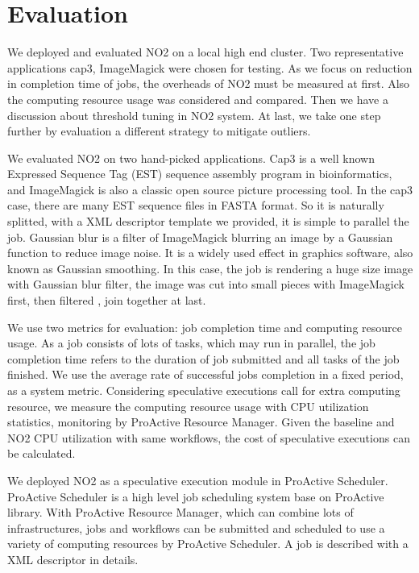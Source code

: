 \section{Evaluation}
We deployed and evaluated NO2 on a local high end cluster. Two representative applications cap3, ImageMagick were chosen for testing. As we focus on reduction in completion time of jobs, the overheads of NO2 must be measured at first. Also the computing resource usage was considered and compared. Then we have a discussion about threshold tuning in NO2 system. At last, we take one step further by evaluation a different strategy to mitigate outliers.

We evaluated NO2 on two hand-picked applications. Cap3 is a well known Expressed Sequence Tag (EST) sequence assembly program in bioinformatics, and ImageMagick is also a classic open source picture processing tool. In the cap3 case, there are many EST sequence files in FASTA format. So it is naturally splitted, with a XML descriptor template we provided, it is simple to parallel the job. Gaussian blur is a filter of ImageMagick blurring an image by a Gaussian function to reduce image noise. It is a widely used effect in graphics software, also known as Gaussian smoothing. In this case, the job is rendering a huge size image with Gaussian blur filter, the image was cut into small pieces with ImageMagick first, then filtered , join together at last. 

We use two metrics for evaluation: job completion time and computing resource usage. As a job consists of lots of tasks, which may run in parallel, the job completion time refers to the duration of job submitted and all tasks of the job finished. We use the average rate of successful jobs completion in a fixed period, as a system metric. Considering speculative executions call for extra computing resource, we measure the computing resource usage with CPU utilization statistics, monitoring by ProActive Resource Manager. Given the baseline and NO2 CPU utilization with same workflows, the cost of speculative executions can be calculated.

 We deployed NO2 as a speculative execution module in ProActive Scheduler. ProActive Scheduler is a high level job scheduling system base on ProActive library. With ProActive Resource Manager, which can combine lots of infrastructures, jobs and workflows can be submitted and scheduled to use a variety of computing resources by ProActive Scheduler. A job is described with a XML descriptor in details.


